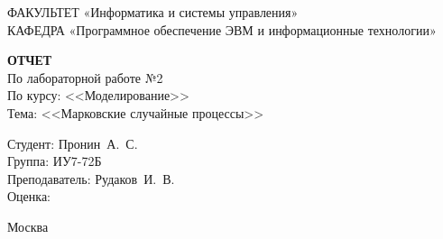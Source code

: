 \begin{titlepage}
	{\doublespacing \small \raggedright ФАКУЛЬТЕТ \hspace{25mm} «Информатика и системы управления»\\
	КАФЕДРА \hspace{5mm} «Программное обеспечение ЭВМ и информационные технологии»\\}

	\vspace{30mm}
	
	\textbf{ОТЧЕТ}\\
	По лабораторной работе №2\\
	По курсу: <<Моделирование>>\\
	Тема: <<Марковские случайные процессы>>\\

	\vspace{60mm}

	\hspace{70mm} Студент:       \hfill Пронин~А.~С.\\
	\hspace{70mm} Группа:        \hfill ИУ7-72Б\\
	\hspace{70mm} Преподаватель: \hfill Рудаков~И.~В.\\
	\hspace{70mm} Оценка:        \hfill \hrulefill\\

	\vfill
	
	Москва\\
	\the\year
\end{titlepage}

\setcounter{page}{2}